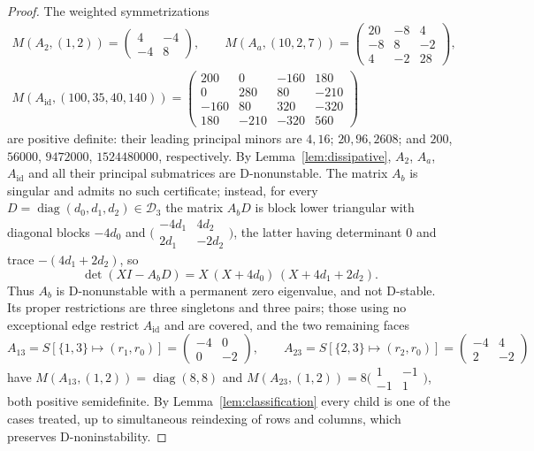 \documentclass[11pt,a4paper]{article}
\theoremstyle{plain}
\theoremstyle{definition}
\theoremstyle{remark}
\newcommand{\diag}{\operatorname{diag}}
\begin{document}
\begin{proof}
The weighted symmetrizations
\begin{gather*}
M(A_2,(1,2))=\begin{pmatrix}4&-4\\-4&8\end{pmatrix},\qquad
M(A_a,(10,2,7))=\begin{pmatrix}20&-8&4\\-8&8&-2\\4&-2&28\end{pmatrix},\\[4pt]
M(A_{\mathrm{id}},(100,35,40,140))=\begin{pmatrix}200&0&-160&180\\0&280&80&-210\\-160&80&320&-320\\180&-210&-320&560\end{pmatrix}
\end{gather*}
are positive definite: their leading principal minors are $4,16$; $20,96,2608$; and $200$, $56000$, $9472000$, $1524480000$, respectively. By Lemma~\ref{lem:dissipative}, $A_2$, $A_a$, $A_{\mathrm{id}}$ and all their principal submatrices are D-nonunstable. The matrix $A_b$ is singular and admits no such certificate; instead, for every $D=\diag(d_0,d_1,d_2)\in\mathcal D_3$ the matrix $A_bD$ is block lower triangular with diagonal blocks $-4d_0$ and $\bigl(\begin{smallmatrix}-4d_1&4d_2\\2d_1&-2d_2\end{smallmatrix}\bigr)$, the latter having determinant $0$ and trace $-(4d_1+2d_2)$, so
\begin{equation}\label{eq:Ab}
  \det(XI-A_bD)=X\,(X+4d_0)\,(X+4d_1+2d_2).
\end{equation}
Thus $A_b$ is D-nonunstable with a permanent zero eigenvalue, and not D-stable. Its proper restrictions are three singletons and three pairs; those using no exceptional edge restrict $A_{\mathrm{id}}$ and are covered, and the two remaining faces
\[
A_{13}=S[\{1,3\}\mapsto(r_1,r_0)]=\begin{pmatrix}-4&0\\0&-2\end{pmatrix},\qquad
A_{23}=S[\{2,3\}\mapsto(r_2,r_0)]=\begin{pmatrix}-4&4\\2&-2\end{pmatrix}
\]
have $M(A_{13},(1,2))=\diag(8,8)$ and $M(A_{23},(1,2))=8\bigl(\begin{smallmatrix}1&-1\\-1&1\end{smallmatrix}\bigr)$, both positive semidefinite. By Lemma~\ref{lem:classification} every child is one of the cases treated, up to simultaneous reindexing of rows and columns, which preserves D-noninstability.
\end{proof}
\end{document}
